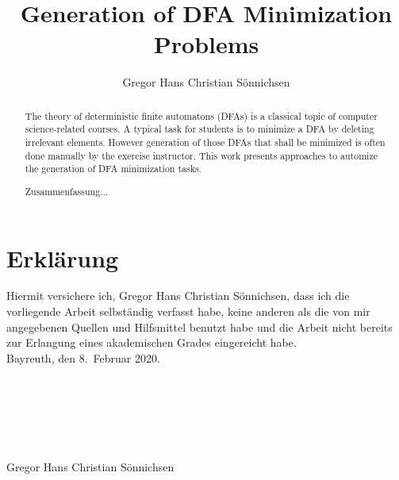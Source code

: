 \documentclass[a4paper, oneside, 11pt]{report}
\title{Generation of DFA Minimization Problems}
\author{Gregor Hans Christian Sönnichsen}
\theoremstyle{definition}
\theoremstyle{remark}
\begin{document}
	
	\maketitle
	
	\begin{abstract}
        The theory of deterministic finite automatons (DFAs) is a classical topic of computer science-related courses. A typical task for students is to minimize a DFA by deleting irrelevant elements. However generation of those DFAs that shall be minimized is often done manually by the exercise instructor. This work presents approaches to automize the generation of DFA minimization tasks.
	\end{abstract}

	\renewcommand{\abstractname}{Generierung von DFA Minimierungsproblemen\\-\\Zusammenfassung}
	\begin{abstract}
		Zusammenfassung$\ldots$
	\end{abstract}
	
	
	\renewcommand{\contentsname}{Table of Contents}
	\tableofcontents
	
	
	
	
	
	
	\appendix
	
	\nocite{*}
	
	
	
	\chapter{Erklärung}
	
	Hiermit versichere ich, Gregor Hans Christian Sönnichsen, dass ich die vorliegende Arbeit selbständig verfasst habe, keine anderen als die von mir angegebenen Quellen und Hilfsmittel benutzt habe und die Arbeit nicht  bereits zur Erlangung eines akademischen Grades eingereicht habe. \\
	
	\noindent Bayreuth, den 8.\ Februar 2020. \\\\\\\\\\\\\\
	\noindent Gregor Hans Christian Sönnichsen
\end{document}
